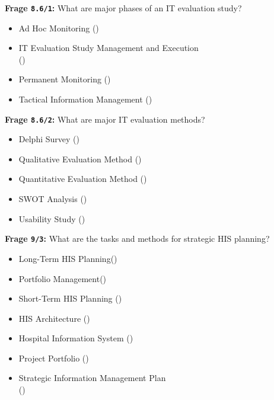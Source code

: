 \textbf{Frage \texttt{8.6/1}:} What are major phases of an IT evaluation study?

\begin{itemize}
  \item Ad Hoc Monitoring ()
  \item IT Evaluation Study Management and Execution \\
  ()
  \item Permanent Monitoring ()
  \item Tactical Information Management ()
\end{itemize}

\textbf{Frage \texttt{8.6/2}:} What are major IT evaluation methods?

\begin{itemize}
  \item Delphi Survey ()
  \item Qualitative Evaluation Method ()
  \item Quantitative Evaluation Method ()
  \item SWOT Analysis ()
  \item Usability Study ()
\end{itemize}

\textbf{Frage \texttt{9/3}:} What are the tasks and methods for strategic HIS planning?

\begin{itemize}
  \item Long-Term HIS Planning()
  \item Portfolio Management()
  \item Short-Term HIS Planning ()
  \item HIS Architecture ()
  \item Hospital Information System ()
  \item Project Portfolio ()
  \item Strategic Information Management Plan \\
  ()
\end{itemize}

